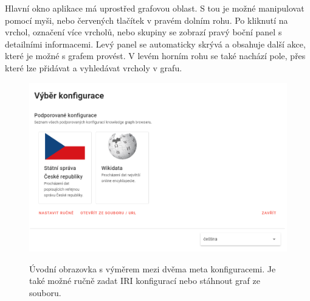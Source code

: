 Hlavní okno aplikace má uprostřed grafovou oblast. S tou je možné manipulovat pomocí myši, nebo červených tlačítek v pravém dolním rohu. Po kliknutí na vrchol, označení více vrcholů, nebo skupiny se zobrazí pravý boční panel s detailními informacemi. Levý panel se automaticky skrývá a obsahuje další akce, které je možné s grafem provést. V levém horním rohu se také nachází pole, přes které lze přidávat a vyhledávat vrcholy v grafu.

\begin{figure}[h]
    \centering
    \includegraphics[width=\textwidth]{media/metaconfiguration.png}\\
    \caption{Úvodní obrazovka s výměrem mezi dvěma meta konfiguracemi. Je také možné ručně zadat IRI konfigurací nebo stáhnout graf ze souboru.}
\end{figure}

\newpage

